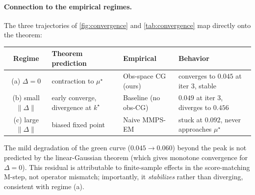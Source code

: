 \documentclass{article}
\theoremstyle{plain}
\theoremstyle{definition}
\theoremstyle{remark}
\begin{document}
\paragraph{Connection to the empirical regimes.}
The three trajectories of \cref{fig:convergence} and \cref{tab:convergence} map directly onto the theorem:
\begin{center}
\begin{tabular}{c|l|l|l}
\toprule
\textbf{Regime} & \textbf{Theorem prediction} & \textbf{Empirical} & \textbf{Behavior} \\
\midrule
(a) $\Delta = 0$        & contraction to $\mu^\star$     & Obs-space CG (ours)       & converges to $0.045$ at iter 3, stable \\
(b) small $\|\Delta\|$  & early converge, divergence at $k^\star$ & Baseline (no obs-CG)    & $0.049$ at iter 3, diverges to $0.456$ \\
(c) large $\|\Delta\|$  & biased fixed point              & Naive MMPS-EM             & stuck at $0.092$, never approaches $\mu^\star$ \\
\bottomrule
\end{tabular}
\end{center}

The mild degradation of the green curve ($0.045 \to 0.060$) beyond the peak is not predicted by the linear-Gaussian theorem (which gives monotone convergence for $\Delta = 0$). This residual is attributable to finite-sample effects in the score-matching M-step, not operator mismatch; importantly, it \emph{stabilizes} rather than diverging, consistent with regime (a).
\end{document}
